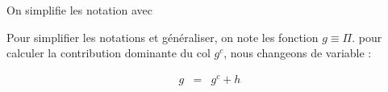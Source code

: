 	\begin{figure}[H]
		\centering 
		\captionsetup{skip=10pt} %
	\end{figure}
	
	
	
	
On simplifie les notation avec 

Pour simplifier les notations et généraliser, on note les fonction $g \equiv \Pi$. pour calculer la contribution dominante du col $g^c$, nous changeons de variable :


\begin{eqnarray*}
	g & = & g^c + h 	
\end{eqnarray*}

